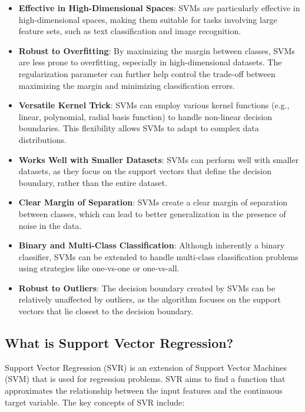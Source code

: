 \begin{itemize}
    \item \textbf{Effective in High-Dimensional Spaces}: SVMs are particularly effective in high-dimensional spaces, making them suitable for tasks involving large feature sets, such as text classification and image recognition.
    \item \textbf{Robust to Overfitting}: By maximizing the margin between classes, SVMs are less prone to overfitting, especially in high-dimensional datasets. The regularization parameter can further help control the trade-off between maximizing the margin and minimizing classification errors.
    \item \textbf{Versatile Kernel Trick}: SVMs can employ various kernel functions (e.g., linear, polynomial, radial basis function) to handle non-linear decision boundaries. This flexibility allows SVMs to adapt to complex data distributions.
    \item \textbf{Works Well with Smaller Datasets}: SVMs can perform well with smaller datasets, as they focus on the support vectors that define the decision boundary, rather than the entire dataset.
    \item \textbf{Clear Margin of Separation}: SVMs create a clear margin of separation between classes, which can lead to better generalization in the presence of noise in the data.
    \item \textbf{Binary and Multi-Class Classification}: Although inherently a binary classifier, SVMs can be extended to handle multi-class classification problems using strategies like one-vs-one or one-vs-all.
    \item \textbf{Robust to Outliers}: The decision boundary created by SVMs can be relatively unaffected by outliers, as the algorithm focuses on the support vectors that lie closest to the decision boundary.
\end{itemize}


\subsection{What is Support Vector Regression?}

Support Vector Regression (SVR) is an extension of Support Vector Machines (SVM) that is used for regression problems. SVR aims to find a function that approximates the relationship between the input features and the continuous target variable. The key concepts of SVR include:

